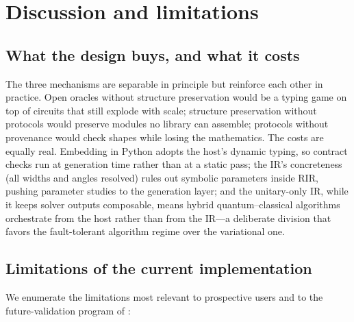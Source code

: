 \section{Discussion and limitations}
\label{sec:discussion}

\subsection{What the design buys, and what it costs}
\label{sec:tradeoffs}

The three mechanisms are separable in principle but reinforce each other in
practice.  Open oracles without structure preservation would be a typing
game on top of circuits that still explode with scale; structure
preservation without protocols would preserve modules no library can
assemble; protocols without provenance would check shapes while losing the
mathematics.  The costs are equally real.  Embedding in Python adopts the
host's dynamic typing, so contract checks run at generation time rather
than at a static pass; the IR's concreteness (all widths and angles
resolved) rules out symbolic parameters inside RIR, pushing parameter
studies to the generation layer; and the unitary-only IR, while it keeps
solver outputs composable, means hybrid quantum--classical algorithms
orchestrate from the host rather than from the IR---a deliberate division
that favors the fault-tolerant algorithm regime over the variational one.

\subsection{Limitations of the current implementation}
\label{sec:limitations}

We enumerate the limitations most relevant to prospective users and to the
future-validation program of :

